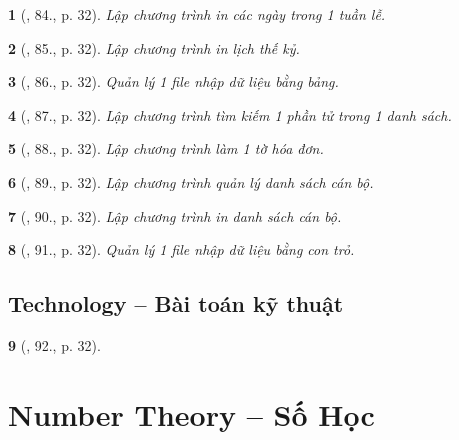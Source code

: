 \documentclass{article}
\newtheorem{baitoan}{}
\begin{document}
\begin{baitoan}[\cite{Doanh_Tuan_Pascal}, 84., p. 32]
	Lập chương trình in các ngày trong 1 tuần lễ.
\end{baitoan}

\begin{baitoan}[\cite{Doanh_Tuan_Pascal}, 85., p. 32]
	Lập chương trình in lịch thế kỷ.
\end{baitoan}

\begin{baitoan}[\cite{Doanh_Tuan_Pascal}, 86., p. 32]
	Quản lý 1 file nhập dữ liệu bằng bảng.
\end{baitoan}

\begin{baitoan}[\cite{Doanh_Tuan_Pascal}, 87., p. 32]
	Lập chương trình tìm kiếm 1 phần tử trong 1 danh sách.
\end{baitoan}

\begin{baitoan}[\cite{Doanh_Tuan_Pascal}, 88., p. 32]
	Lập chương trình làm 1 tờ hóa đơn.
\end{baitoan}

\begin{baitoan}[\cite{Doanh_Tuan_Pascal}, 89., p. 32]
	Lập chương trình quản lý danh sách cán bộ.
\end{baitoan}

\begin{baitoan}[\cite{Doanh_Tuan_Pascal}, 90., p. 32]
	Lập chương trình in danh sách cán bộ.
\end{baitoan}

\begin{baitoan}[\cite{Doanh_Tuan_Pascal}, 91., p. 32]
	Quản lý 1 file nhập dữ liệu bằng con trỏ.
\end{baitoan}


\subsection{Technology -- Bài toán kỹ thuật}

\begin{baitoan}[\cite{Doanh_Tuan_Pascal}, 92., p. 32]
	
\end{baitoan}


\section{Number Theory -- Số Học}
\end{document}
